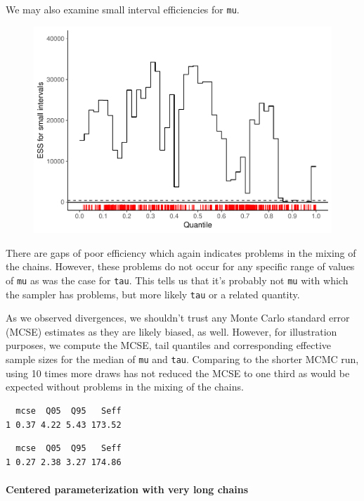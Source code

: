 \documentclass[american,]{article}
\let\oldparagraph\paragraph
\renewcommand{\paragraph}[1]{\oldparagraph{#1}\mbox{}}
\begin{document}
We may also examine small interval efficiencies for \texttt{mu}.

\begin{figure}[tp]
  \centering
  \includegraphics[width=0.6\linewidth]{graphics/local-ess-fit-cp2-mu-1.pdf}
\end{figure}

There are gaps of poor efficiency which again indicates problems in the
mixing of the chains. However, these problems do not occur for any
specific range of values of \texttt{mu} as was the case for
\texttt{tau}. This tells us that it's probably not \texttt{mu} with
which the sampler has problems, but more likely \texttt{tau} or a
related quantity.

As we observed divergences, we shouldn't trust any Monte Carlo standard
error (MCSE) estimates as they are likely biased, as well. However, for
illustration purposes, we compute the MCSE, tail quantiles and
corresponding effective sample sizes for the median of \texttt{mu} and
\texttt{tau}. Comparing to the shorter MCMC run, using 10 times more
draws has not reduced the MCSE to one third as would be expected without
problems in the mixing of the chains.

\begin{verbatim}
  mcse  Q05  Q95   Seff
1 0.37 4.22 5.43 173.52
\end{verbatim}

\begin{verbatim}
  mcse  Q05  Q95   Seff
1 0.27 2.38 3.27 174.86
\end{verbatim}

\hypertarget{centered-parameterization-with-very-long-chains}{%
\paragraph{Centered parameterization with very long
chains}\label{centered-parameterization-with-very-long-chains}}
\end{document}

